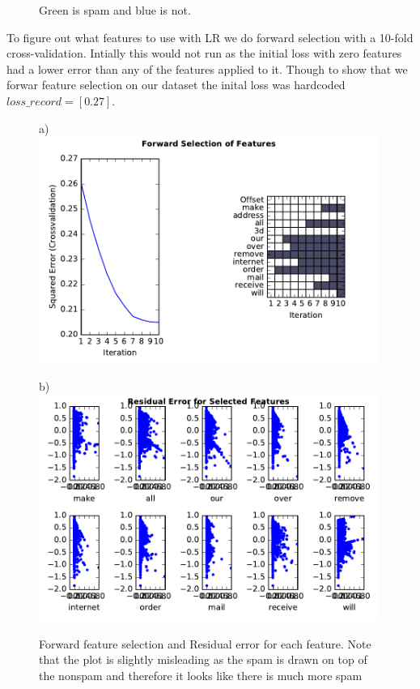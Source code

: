 \documentclass[11pt, paper=a4]{article}
\begin{document}
\begin{figure}[h]
\begin{minipage}{0.3\textwidth}
  \end{minipage} \vfill
  \caption{\label{fig:modelcheck} Green is spam and blue is not.}
\end{figure}

To figure out what features to use with LR we do forward selection
with a 10-fold cross-validation. Intially this would not run as the
initial loss with zero features had a lower error than any of the
features applied to it. Though to show that we forwar feature
selection on our dataset the inital loss was hardcoded
$loss\_record=[0.27]$.

\begin{figure}[h]
  \begin{minipage}{0.5\textwidth}
    a)\\
    \includegraphics[width = 0.99\textwidth]{../../src/img/best_forward_selection.pdf}
  \end{minipage} \hfill
  \begin{minipage}{0.5\textwidth}
    b)\\
    \includegraphics[width = 0.99\textwidth]{../../src/img/residual_error.pdf}
  \end{minipage} \hfill
  \caption{\label{fig:residual-error} Forward feature selection and
    Residual error for each feature. Note that the plot is slightly
    misleading as the spam is drawn on top of the nonspam and
    therefore it looks like there is much more spam}
\end{figure}
\end{document}

